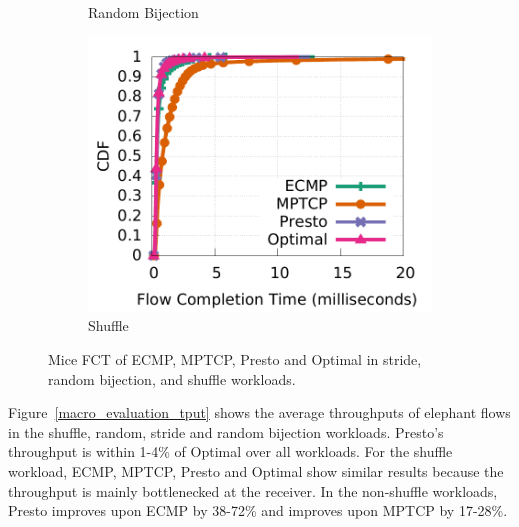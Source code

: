\begin{figure}[!t]
\begin{subfigure}[b]{0.3\textwidth}
        	\caption{Random Bijection}
        	\label{macro_evaluation_fct_bijection}
	\end{subfigure}
        \begin{subfigure}[b]{0.3\textwidth}
                \centering
		\includegraphics[width=\textwidth]{./figures/presto/macro/shuffle/macro_compare_fct_shuffle_mice.pdf}
        	\caption{Shuffle}
        	\label{macro_evaluation_fct_shuffle}
	\end{subfigure}
	\caption{Mice FCT of ECMP, MPTCP, Presto and Optimal in stride, random bijection, and shuffle workloads.}
	\label{macro_evaluation_fct}
\end{figure}

Figure~\ref{macro_evaluation_tput} 
shows the average throughputs of elephant flows in the shuffle, random, stride and random bijection workloads.
Presto's throughput is within 1-4\% of Optimal over all workloads.
For the shuffle workload, ECMP, MPTCP, Presto and Optimal show similar results 
because the throughput is mainly bottlenecked at the receiver. 
In the non-shuffle workloads, Presto improves upon ECMP by 38-72\% and improves
upon MPTCP by 17-28\%.

